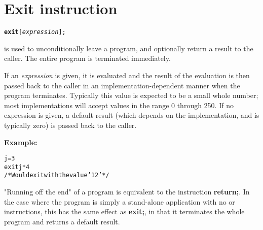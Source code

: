 \chapter{Exit instruction}\label{refexit}
\begin{shaded}
\begin{alltt}
\textbf{exit} [\emph{expression}];
\end{alltt}
\end{shaded}
  is used to unconditionally leave a program, and
optionally return a result to the caller.
The entire program is terminated immediately.

If an \emph{expression} is given, it is evaluated and the result
of the evaluation is then passed back to the caller in an
implementation-dependent manner when the program terminates.
Typically this value is expected to be a small whole number; most
implementations will accept values in the range 0 through 250.
If no expression is given, a default result (which depends on the
implementation, and is typically zero) is passed back to the caller.

\textbf{Example:}
\begin{alltt}
j=3
exit j*4
/* Would exit with the value '12' */
\end{alltt}
 "Running off the end" of a program is equivalent to the
instruction \textbf{return;}.  In the case where the program is simply
a stand-alone application with no  or 
instructions, this has the same effect as \textbf{exit;}, in that it
terminates the whole program and returns a default result.
